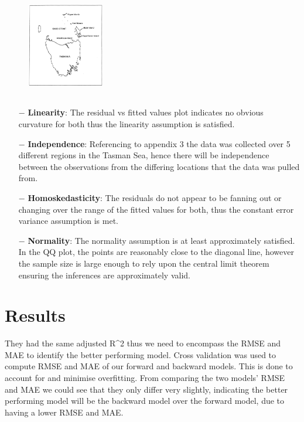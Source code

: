 \documentclass[letterpaper,9pt,twocolumn,twoside,]{pinp}
\begin{document}
\begin{figure}[!h]
    \begin{center}
    \includegraphics[width=0.3\textwidth, height=1.8in]{Independence} 
    \end{center}
\end{figure}

\begin{itemize}
     \item[$-$] \textbf{Linearity}: The residual vs fitted values plot indicates no obvious curvature for both thus the linearity assumption is satisfied.
     \item[$-$] \textbf{Independence}: Referencing to appendix 3 the data was collected over 5 different regions in the Tasman Sea, hence there will be independence between the observations from the differing locations that the data was pulled from.
     \item[$-$] \textbf{Homoskedasticity}: The residuals do not appear to be fanning out or changing over the range of the fitted values for both, thus the constant error variance assumption is met.
     \item[$-$] \textbf{Normality}: The normality assumption is at least approximately satisfied. In the QQ plot, the points are reasonably close to the diagonal line, however the sample size is large enough to rely upon the central limit theorem ensuring the inferences are approximately valid.
\end{itemize}

\section{Results}\label{results}

They had the same adjusted R\^{}2 thus we need to encompass the RMSE and
MAE to identify the better performing model. Cross validation was used
to compute RMSE and MAE of our forward and backward models. This is done
to account for and minimise overfitting. From comparing the two models'
RMSE and MAE we could see that they only differ very slightly,
indicating the better performing model will be the backward model over
the forward model, due to having a lower RMSE and MAE.
\end{document}
